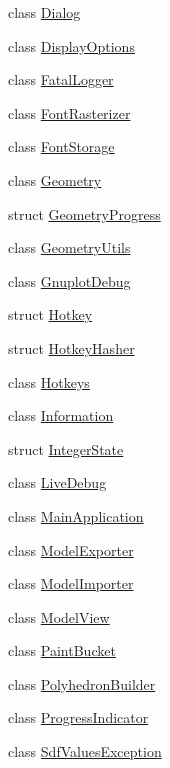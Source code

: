 \begin{DoxyCompactItemize}
class \mbox{\hyperlink{classpepr3d_1_1_dialog}{Dialog}}
\item 
class \mbox{\hyperlink{classpepr3d_1_1_display_options}{Display\+Options}}
\item 
class \mbox{\hyperlink{classpepr3d_1_1_fatal_logger}{Fatal\+Logger}}
\item 
class \mbox{\hyperlink{classpepr3d_1_1_font_rasterizer}{Font\+Rasterizer}}
\item 
class \mbox{\hyperlink{classpepr3d_1_1_font_storage}{Font\+Storage}}
\item 
class \mbox{\hyperlink{classpepr3d_1_1_geometry}{Geometry}}
\item 
struct \mbox{\hyperlink{structpepr3d_1_1_geometry_progress}{Geometry\+Progress}}
\item 
class \mbox{\hyperlink{classpepr3d_1_1_geometry_utils}{Geometry\+Utils}}
\item 
class \mbox{\hyperlink{classpepr3d_1_1_gnuplot_debug}{Gnuplot\+Debug}}
\item 
struct \mbox{\hyperlink{structpepr3d_1_1_hotkey}{Hotkey}}
\item 
struct \mbox{\hyperlink{structpepr3d_1_1_hotkey_hasher}{Hotkey\+Hasher}}
\item 
class \mbox{\hyperlink{classpepr3d_1_1_hotkeys}{Hotkeys}}
\item 
class \mbox{\hyperlink{classpepr3d_1_1_information}{Information}}
\item 
struct \mbox{\hyperlink{structpepr3d_1_1_integer_state}{Integer\+State}}
\item 
class \mbox{\hyperlink{classpepr3d_1_1_live_debug}{Live\+Debug}}
\item 
class \mbox{\hyperlink{classpepr3d_1_1_main_application}{Main\+Application}}
\item 
class \mbox{\hyperlink{classpepr3d_1_1_model_exporter}{Model\+Exporter}}
\item 
class \mbox{\hyperlink{classpepr3d_1_1_model_importer}{Model\+Importer}}
\item 
class \mbox{\hyperlink{classpepr3d_1_1_model_view}{Model\+View}}
\item 
class \mbox{\hyperlink{classpepr3d_1_1_paint_bucket}{Paint\+Bucket}}
\item 
class \mbox{\hyperlink{classpepr3d_1_1_polyhedron_builder}{Polyhedron\+Builder}}
\item 
class \mbox{\hyperlink{classpepr3d_1_1_progress_indicator}{Progress\+Indicator}}
\item 
class \mbox{\hyperlink{classpepr3d_1_1_sdf_values_exception}{Sdf\+Values\+Exception}}

\end{DoxyCompactItemize}
